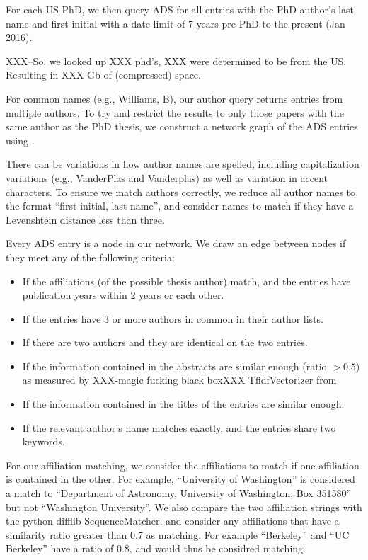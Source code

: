 \documentclass{emulateapj}
\begin{document}
For each US PhD, we then query ADS for all entries with the PhD author's last name and first initial with a date limit of 7 years pre-PhD to the present (Jan 2016).

XXX--So, we looked up XXX phd's, XXX were determined to be from the US. Resulting in XXX Gb of (compressed) space.  

For common names (e.g.,  Williams, B), our author query returns entries from multiple authors.  To try and restrict the results to only those papers with the same author as the PhD thesis, we construct a network graph of the ADS entries using \citet{networkx}.

There can be variations in how author names are spelled, including capitalization variations (e.g., VanderPlas and Vanderplas) as well as variation in accent characters.  To ensure we match authors correctly, we reduce all author names to the format ``first initial, last name'', and consider names to match if they have a Levenshtein distance less than three.

Every ADS entry is a node in our network. We draw an edge between nodes if they meet any of the following criteria:

\begin{itemize}
\item{If the affiliations (of the possible thesis author) match, and the entries have publication years within 2 years or each other.}
\item{If the entries have 3 or more authors in common in their author lists.}
\item{If there are two authors and they are identical on the two entries.}
\item{If the information contained in the abstracts are similar enough (ratio $> 0.5$) as measured by XXX-magic fucking black boxXXX TfidfVectorizer from \citet{scikit-learn}}
\item{If the information contained in the titles of the entries are similar enough.}
  \item{If the relevant author's name matches exactly, and the entries share two keywords.}
\end{itemize}

For our affiliation matching, we consider the affiliations to match if one affiliation is contained in the other.  For example, ``University of Washington'' is considered a match to ``Department of Astronomy, University of Washington, Box 351580'' but not ``Washington University''.  We also compare the two affiliation strings with the python difflib SequenceMatcher, and consider any affiliations that have a similarity ratio greater than 0.7 as matching.  For example ``Berkeley'' and ``UC Berkeley'' have a ratio of 0.8, and would thus be considred matching.
\end{document}
